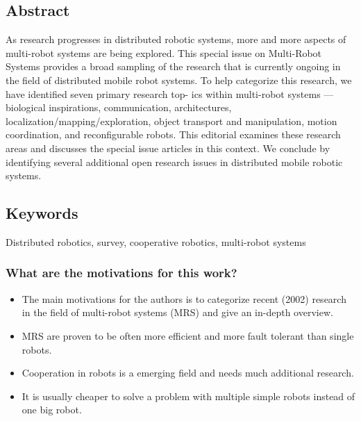     \label{sec:Arai2002}
    \cite{Arai2002}
    
    \subsection*{Abstract}
    As research progresses in distributed robotic systems, more and more aspects of multi-robot systems are being
    explored. This special issue on Multi-Robot Systems provides
    a broad sampling of the research that is currently ongoing in
    the field of distributed mobile robot systems. To help categorize this research, we have identified seven primary research top-
    ics within multi-robot systems — biological inspirations, communication, architectures, localization/mapping/exploration, object
    transport and manipulation, motion coordination, and reconfigurable robots. This editorial examines these research areas and
    discusses the special issue articles in this context. We conclude by
    identifying several additional open research issues in distributed
    mobile robotic systems.
    
    
    \subsection*{Keywords}
    Distributed robotics, survey, cooperative robotics, multi-robot systems
    
    
    
     
    \subsubsection*{What are the motivations for this work?}
    \begin{itemize}
        \item The main motivations for the authors is to categorize recent (2002) research in the field of multi-robot systems (MRS) and give an in-depth overview.
        \item MRS are proven to be often more efficient and more fault tolerant than single robots. 
        \item Cooperation in robots is a emerging field and needs much additional research.
        \item It is usually cheaper to solve a problem with multiple simple robots instead of one big robot.
    \end{itemize}
